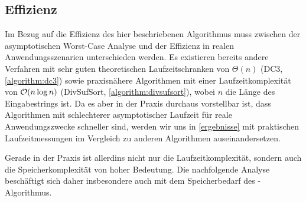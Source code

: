 \subsection{Effizienz}
\label{bpr:effizienz}

Im Bezug auf die Effizienz des hier beschriebenen Algorithmus muss zwischen der asymptotischen Worst-Case Analyse und der Effizienz in realen Anwendungsszenarien unterschieden werden. Es existieren bereits andere Verfahren mit sehr guten theoretischen Laufzeitschranken von \(\Theta(n)\) \cite{saca:9} (DC3, \cref{algorithm:dc3}) sowie praxisnähere Algorithmen mit einer Laufzeitkomplexität von \(\mathcal{O}(n \log n)\) \cite{saca:5} (DivSufSort, \cref{algorithm:divsufsort}), wobei \(n\) die Länge des Eingabestrings ist. Da es aber in der Praxis durchaus vorstellbar ist, dass Algorithmen mit schlechterer asymptotischer Laufzeit für reale Anwendungszwecke schneller sind, werden wir uns in \cref{ergebnisse} mit praktischen Laufzeitmessungen im Vergleich zu anderen Algorithmen auseinandersetzen.\par
Gerade in der Praxis ist allerdins nicht nur die Laufzeitkomplexität, sondern auch die Speicherkomplexität von hoher Bedeutung. Die nachfolgende Analyse beschäftigt sich daher insbesondere auch mit dem Speicherbedarf des \bpr-Algorithmus.


%

